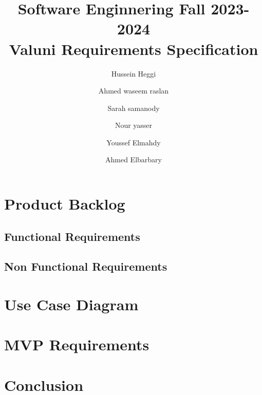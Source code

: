 \documentclass{article}
\title{Software Enginnering Fall 2023-2024 \\ Valuni Requirements Specification}
\author{  
Hussein Heggi 	\and
Ahmed waseem raslan 	\and
Sarah samanody 	\and
Nour yasser 	\and
Youssef Elmahdy	\and
Ahmed Elbarbary	}
\begin{document}
\maketitle

\section{Product Backlog}

\subsection{Functional Requirements}

\subsection{Non Functional Requirements}

\section{Use Case Diagram} 

\section{MVP Requirements}

\section{Conclusion}
\end{document}
